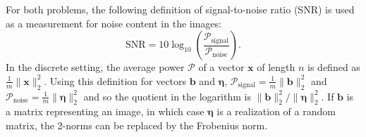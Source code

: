 \documentclass[12pt]{article}
\newcommand{\mA}{m}	%
\newcommand{\bVec}{\mathbf{b}}	%
\newcommand{\xVec}{\mathbf{x}}	%
\newcommand{\noise}{\eta}	%
\newcommand{\noiseVec}{\bm{\noise}}	%
\begin{document}
For both problems, the following definition of signal-to-noise ratio (SNR) is used as a measurement for noise content in the images:
\begin{equation}
\label{eq:SNR}
\text{SNR} = 10\log_{10}\left(\frac{\mathcal{P}_{\text{signal}}}{\mathcal{P}_{\text{noise}}}\right).
\end{equation}
In the discrete setting, the average power $\mathcal{P}$ of a vector $\xVec$ of length $n$ is defined as $\frac{1}{\mA}\|\xVec\|^2_2$. Using this definition for vectors $\bVec$ and $\noiseVec$, $\mathcal{P}_{\text{signal}} = \frac{1}{\mA}\|\bVec\|^2_2$ and $\mathcal{P}_{\text{noise}} = \frac{1}{\mA}\|\noiseVec\|^2_2$ and so the quotient in the logarithm is $\|\bVec\|_2^2/\|\noiseVec\|_2^2$. If $\bVec$ is a matrix representing an image, in which case $\noiseVec$ is a realization of a random matrix, the 2-norms can be replaced by the Frobenius norm.
\end{document}
